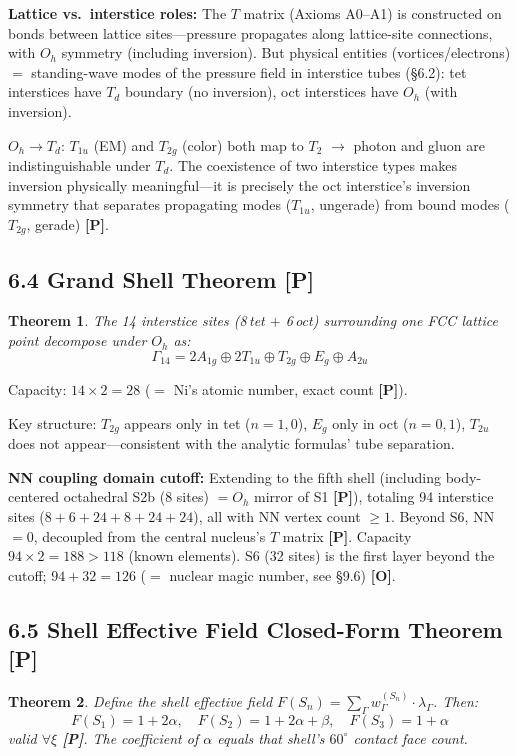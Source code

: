 \documentclass[11pt,a4paper]{article}
\newtheorem{theorem}{Theorem}[section]
\newcommand{\gradeP}{\textbf{[P]}}
\newcommand{\gradeO}{\textbf{[O]}}
\begin{document}
\textbf{Lattice vs.\ interstice roles:} The $T$ matrix (Axioms A0--A1) is constructed on bonds between lattice sites---pressure propagates along lattice-site connections, with $O_h$ symmetry (including inversion). But physical entities (vortices/electrons) $=$ standing-wave modes of the pressure field in interstice tubes (\S6.2): tet interstices have $T_d$ boundary (no inversion), oct interstices have $O_h$ (with inversion).

$O_h\to T_d$: $T_{1u}$ (EM) and $T_{2g}$ (color) both map to $T_2$ $\to$ photon and gluon are indistinguishable under $T_d$. The coexistence of two interstice types makes inversion physically meaningful---it is precisely the oct interstice's inversion symmetry that separates propagating modes ($T_{1u}$, ungerade) from bound modes ($T_{2g}$, gerade) \gradeP.

\subsection{6.4 Grand Shell Theorem \gradeP}

\begin{theorem}
The 14 interstice sites (8\,tet $+$ 6\,oct) surrounding one FCC lattice point decompose under $O_h$ as:
\[
\Gamma_{14} = 2A_{1g}\oplus 2T_{1u}\oplus T_{2g}\oplus E_g\oplus A_{2u}
\]
\end{theorem}

Capacity: $14\times 2 = 28$ ($=$ Ni's atomic number, exact count \gradeP).

Key structure: $T_{2g}$ appears only in tet ($n=1,0$), $E_g$ only in oct ($n=0,1$), $T_{2u}$ does not appear---consistent with the analytic formulas' tube separation.

\textbf{NN coupling domain cutoff:} Extending to the fifth shell (including body-centered octahedral S2b (8 sites) $= O_h$ mirror of S1 \gradeP), totaling 94 interstice sites ($8+6+24+8+24+24$), all with NN vertex count $\geq 1$. Beyond S6, NN$=0$, decoupled from the central nucleus's $T$ matrix \gradeP. Capacity $94\times 2=188>118$ (known elements). S6 (32 sites) is the first layer beyond the cutoff; $94+32=126$ ($=$ nuclear magic number, see \S9.6) \gradeO.

\subsection{6.5 Shell Effective Field Closed-Form Theorem \gradeP}

\begin{theorem}
Define the shell effective field $F(S_n) = \sum_\Gamma w_\Gamma^{(S_n)}\cdot\lambda_\Gamma$. Then:
\[
F(S_1) = 1+2\alpha,\quad F(S_2) = 1+2\alpha+\beta,\quad F(S_3) = 1+\alpha
\]
valid $\forall\xi$ \gradeP. The coefficient of $\alpha$ equals that shell's $60^\circ$ contact face count.
\end{theorem}
\end{document}

